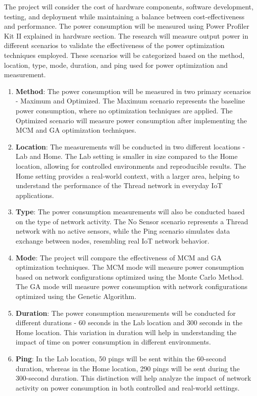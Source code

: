 The project will consider the cost of hardware components, software development, testing, and deployment while maintaining a balance between cost-effectiveness and performance. The power consumption will be measured using Power Profiler Kit II explained in hardware section. The research will measure output power in different scenarios to validate the effectiveness of the power optimization techniques employed. These scenarios will be categorized based on the method, location, type, mode, duration, and ping used for power optimization and measurement.

\begin{enumerate}
  \item \textbf{Method}: The power consumption will be measured in two primary scenarios - Maximum and Optimized. The Maximum scenario represents the baseline power consumption, where no optimization techniques are applied. The Optimized scenario will measure power consumption after implementing the MCM and GA optimization techniques.
  \item \textbf{Location}: The measurements will be conducted in two different locations - Lab and Home. The Lab setting is smaller in size compared to the Home location, allowing for controlled environments and reproducible results. The Home setting provides a real-world context, with a larger area, helping to understand the performance of the Thread network in everyday IoT applications.
  \item \textbf{Type}: The power consumption measurements will also be conducted based on the type of network activity. The No Sensor scenario represents a Thread network with no active sensors, while the Ping scenario simulates data exchange between nodes, resembling real IoT network behavior.
  \item \textbf{Mode}: The project will compare the effectiveness of MCM and GA optimization techniques. The MCM mode will measure power consumption based on network configurations optimized using the Monte Carlo Method. The GA mode will measure power consumption with network configurations optimized using the Genetic Algorithm.
  \item \textbf{Duration}: The power consumption measurements will be conducted for different durations - 60 seconds in the Lab location and 300 seconds in the Home location. This variation in duration will help in understanding the impact of time on power consumption in different environments.
  \item \textbf{Ping}: In the Lab location, 50 pings will be sent within the 60-second duration, whereas in the Home location, 290 pings will be sent during the 300-second duration. This distinction will help analyze the impact of network activity on power consumption in both controlled and real-world settings.
\end{enumerate}


